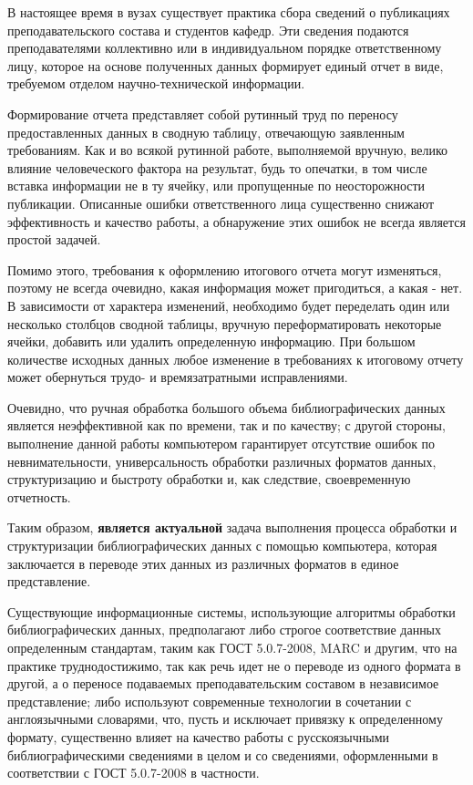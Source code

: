 \Introduction
 
В настоящее время в вузах существует практика сбора сведений о публикациях преподавательского состава и студентов кафедр. Эти сведения подаются преподавателями коллективно или в индивидуальном порядке ответственному лицу, которое на основе полученных данных формирует единый отчет в виде, требуемом отделом научно-технической информации.

Формирование отчета представляет собой рутинный труд по переносу предоставленных данных в сводную таблицу, отвечающую заявленным требованиям. Как и во всякой рутинной работе, выполняемой вручную, велико влияние человеческого фактора на результат, будь то опечатки, в том числе вставка информации не в ту ячейку, или пропущенные по неосторожности публикации. Описанные ошибки ответственного лица существенно снижают эффективность и качество работы, а обнаружение этих ошибок не всегда является простой задачей.

Помимо этого, требования к оформлению итогового отчета могут изменяться, поэтому не всегда очевидно, какая информация может пригодиться, а какая - нет. В зависимости от характера изменений, необходимо будет переделать один или несколько столбцов сводной таблицы, вручную переформатировать некоторые ячейки, добавить или удалить определенную информацию. При большом количестве исходных данных любое изменение в требованиях к итоговому отчету может обернуться трудо- и времязатратными  исправлениями.

Очевидно, что ручная обработка большого объема библиографических данных является неэффективной как по времени, так и по качеству; с другой стороны, выполнение данной работы компьютером гарантирует отсутствие ошибок по невнимательности, универсальность обработки различных форматов данных, структуризацию и быстроту обработки и, как следствие, своевременную отчетность.

Таким образом, \textbf{является актуальной} задача выполнения процесса обработки и структуризации библиографических данных с помощью компьютера, которая заключается в переводе этих данных из различных форматов в единое представление.
 
Существующие информационные системы, использующие алгоритмы обработки библиографических данных, предполагают либо строгое соответствие данных определенным стандартам, таким как ГОСТ 5.0.7-2008, MARC и другим, что на практике труднодостижимо, так как речь идет не о переводе из одного формата в другой, а о переносе подаваемых преподавательским составом в независимое представление; либо используют современные технологии в сочетании с англоязычными словарями, что, пусть и исключает привязку к определенному формату, существенно влияет на качество работы с русскоязычными библиографическими сведениями в целом и со сведениями, оформленными в соответствии с ГОСТ 5.0.7-2008 в частности.

